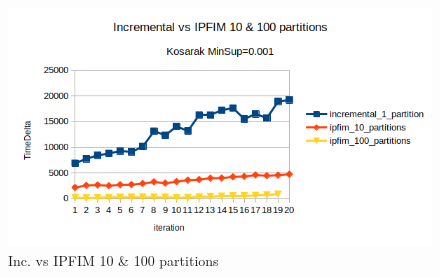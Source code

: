 \begin{figure}[h!]
  \centering
  \includegraphics[width=\linewidth]{figures/IPFIM_1_10_100_part_kosarak}
  \caption{Inc. vs IPFIM 10 \& 100 partitions}
  \label{fig:IPFP1M0001_10_100}
\end{figure}

